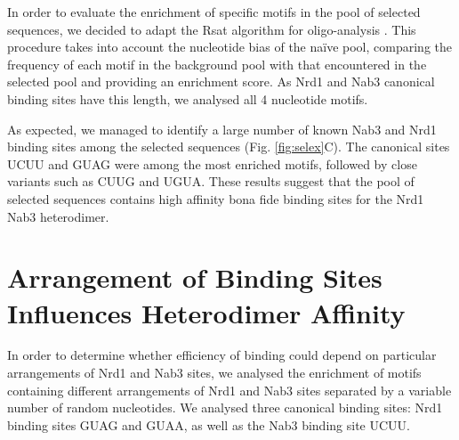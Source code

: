 In order to evaluate the enrichment of specific motifs in the pool of selected sequences, we decided to adapt the Rsat algorithm for oligo-analysis \cite[see methods]{vanhelden:1998:extracting}. This procedure takes into account the nucleotide bias of the naïve pool, comparing the frequency of each motif in the background pool with that encountered in the selected pool and providing an enrichment score. As Nrd1 and Nab3 canonical binding sites have this length, we analysed all 4 nucleotide motifs.

As expected, we managed to identify a large number of known Nab3 and Nrd1 binding sites among the selected sequences (Fig. \ref{fig:selex}C). The canonical sites UCUU and GUAG were among the most enriched motifs, followed by close variants such as CUUG and UGUA. These results suggest that the pool of selected sequences contains high affinity bona fide binding sites for the Nrd1 Nab3 heterodimer. 

\singlespacing
\section{Arrangement of Binding Sites Influences Heterodimer Affinity \invitro{}}
\doublespacing

In order to determine whether efficiency of binding could depend on particular arrangements of Nrd1 and Nab3 sites, we analysed the enrichment of motifs containing different arrangements of Nrd1 and Nab3 sites separated by a variable number of random nucleotides. We analysed three canonical binding sites: Nrd1 binding sites GUAG and GUAA, as well as the Nab3 binding site UCUU.

